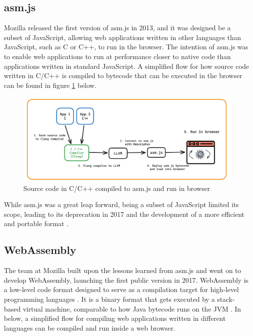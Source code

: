 \documentclass[
  table]{report}
\begin{document}
\subsection{asm.js}
\label{subsect:asm}

Mozilla released the first version of asm.js in 2013, and it was
designed be a subset of JavaScript, allowing web applications written in
other languages than JavaScript, such as C or C++, to run in the
browser. The intention of asm.js was to enable web applications to run
at performance closer to native code than applications written in
standard JavaScript. A simplified flow for how source code written in
C/C++ is compiled to bytecode that can be executed in the browser can be
found in figure \ref{fig:asm-figure} below.

\begin{figure}[H]
\centering
  \includegraphics{assets/asm.js-figure.png}
\caption{Source code in C/C++ compiled to asm.js and run in browser}\label{fig:asm-figure}
\end{figure}

While asm.js was a great leap forward, being a subset of JavaScript
limited its scope, leading to its deprecation in 2017 and the
development of a more efficient and portable format
\citep{webassembly.orgFAQWebAssembly}.

\subsection{WebAssembly}

The team at Mozilla built upon the lessons learned from asm.js and went
on to develop WebAssembly, launching the first public version in 2017.
WebAssembly is a low-level code format designed to serve as a
compilation target for high-level programming languages
\citep{haasBringingWebSpeed2017}. It is a binary format that gets
executed by a stack-based virtual machine, comparable to how Java
bytecode runs on the \ac{JVM} \citep{haasBringingWebSpeed2017}. In
 below, a simplified flow for compiling web
applications written in different languages can be compiled and run
inside a web browser.
\end{document}
